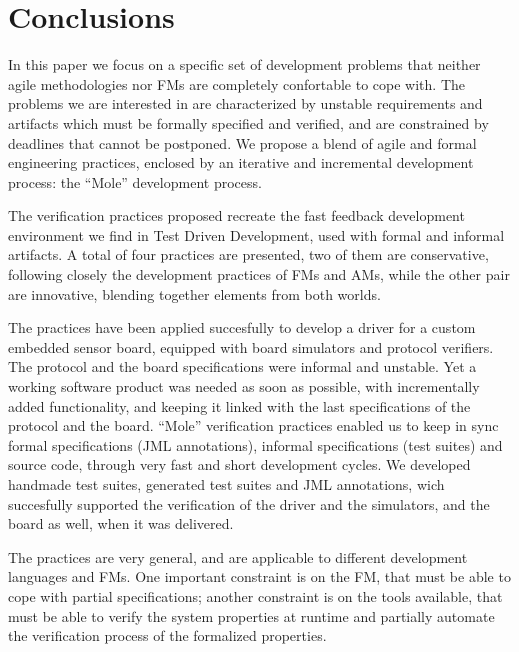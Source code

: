 \documentclass{article}
\begin{document}
\section{Conclusions}
\label{sec:conclusions}

In this paper we focus on a specific set of development problems that neither agile methodologies nor FMs are completely confortable to cope with.
The problems we are interested in are characterized by unstable requirements and artifacts which must be formally specified and verified, and are constrained by deadlines that cannot be postponed.
We propose a blend of agile and formal engineering practices, enclosed by an iterative and incremental development process: the ``Mole'' development process.

The verification practices proposed recreate the fast feedback development environment we find in Test Driven Development, used with formal and informal artifacts.
A total of four practices are presented, two of them are conservative, following closely the development practices of FMs and AMs, while the other pair are innovative, blending together elements from both worlds.

The practices have been applied succesfully to develop a driver for a custom embedded sensor board, equipped with board simulators and protocol verifiers. 
The protocol and the board specifications were informal and unstable. 
Yet a working software product was needed as soon as possible, with incrementally added functionality, and keeping it linked with the last specifications of the protocol and the board.
``Mole'' verification practices enabled us to keep in sync formal specifications (JML annotations), informal specifications (test suites) and source code, through very fast and short development cycles.
We developed handmade test suites, generated test suites and JML annotations, wich succesfully supported the verification of the driver and the simulators, and the board as well, when it was delivered.

The practices are very general, and are applicable to different development languages and FMs.
One important constraint is on the FM, that must be able to cope with partial specifications; another constraint is on the tools available, that must be able to verify the system properties at runtime and partially automate the verification process of the formalized properties.




\end{document}
